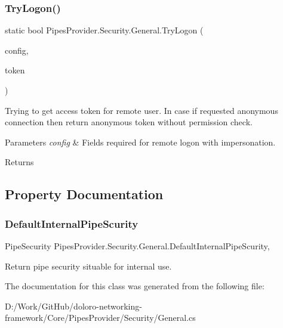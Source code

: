 \subsubsection{\texorpdfstring{Try\+Logon()}{TryLogon()}}
{\footnotesize\ttfamily static bool Pipes\+Provider.\+Security.\+General.\+Try\+Logon (\begin{DoxyParamCaption}\item[{\mbox{\hyperlink{struct_pipes_provider_1_1_security_1_1_logon_config}{Logon\+Config}}}]{config,  }\item[{out Safe\+Access\+Token\+Handle}]{token }\end{DoxyParamCaption})\hspace{0.3cm}{\ttfamily [static]}}



Trying to get access token for remote user. In case if requested anonymous connection then return anonymous token without permission check. 


\begin{DoxyParams}{Parameters}
{\em config} & Fields required for remote logon with impersonation.\\
\hline
\end{DoxyParams}
\begin{DoxyReturn}{Returns}

\end{DoxyReturn}


\subsection{Property Documentation}
\mbox{\label{class_pipes_provider_1_1_security_1_1_general_a49b6c46c031ae200885fcababfdb32c3}} 
\subsubsection{\texorpdfstring{Default\+Internal\+Pipe\+Scurity}{DefaultInternalPipeScurity}}
{\footnotesize\ttfamily Pipe\+Security Pipes\+Provider.\+Security.\+General.\+Default\+Internal\+Pipe\+Scurity\hspace{0.3cm}{\ttfamily [static]}, {\ttfamily [get]}}



Return pipe security situable for internal use. 



The documentation for this class was generated from the following file\+:\begin{DoxyCompactItemize}
\item 
D\+:/\+Work/\+Git\+Hub/doloro-\/networking-\/framework/\+Core/\+Pipes\+Provider/\+Security/General.\+cs\end{DoxyCompactItemize}

